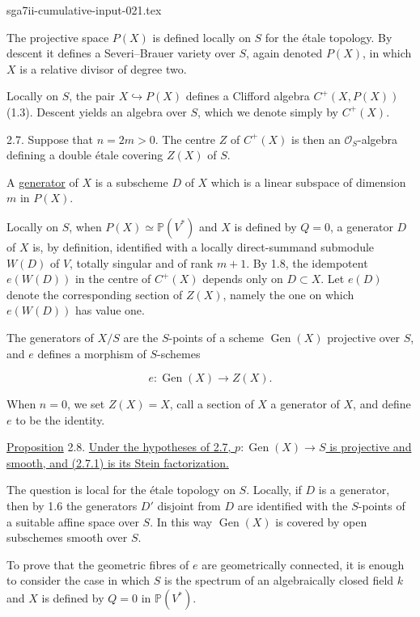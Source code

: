 \begin{filecontents*}{sga7ii-cumulative-input-021.tex}

The projective space $P(X)$ is defined locally on $S$ for the \'{e}tale
topology.  By descent it defines a Severi--Brauer variety over $S$,
again denoted $P(X)$, in which $X$ is a relative divisor of degree two.

Locally on $S$, the pair $X\hookrightarrow P(X)$ defines a Clifford
algebra $C^+(X,P(X))$ (1.3).  Descent yields an algebra over $S$, which
we denote simply by $C^+(X)$.

2.7. Suppose that $n=2m>0$.  The centre $Z$ of $C^+(X)$ is then an
$\mathcal O_S$-algebra defining a double \'{e}tale covering $Z(X)$ of
$S$.

A \underline{generator} of $X$ is a subscheme $D$ of $X$ which is a
linear subspace of dimension $m$ in $P(X)$.

Locally on $S$, when $P(X)\simeq\mathbb P(V^*)$ and $X$ is defined by
$Q=0$, a generator $D$ of $X$ is, by definition, identified with a
locally direct-summand submodule $W(D)$ of $V$, totally singular and of
rank $m+1$.  By 1.8, the idempotent $e(W(D))$ in the centre of $C^+(X)$
depends only on $D\subset X$.  Let $e(D)$ denote the corresponding
section of $Z(X)$, namely the one on which $e(W(D))$ has value one.

The generators of $X/S$ are the $S$-points of a scheme
$\operatorname{Gen}(X)$ projective over $S$, and $e$ defines a morphism
of $S$-schemes

\begin{equation}\tag{2.7.1}
e:\operatorname{Gen}(X)\longrightarrow Z(X).
\end{equation}

When $n=0$, we set $Z(X)=X$, call a section of $X$ a generator of $X$,
and define $e$ to be the identity.


\underline{Proposition} 2.8. \underline{Under the hypotheses of 2.7,
$p:\operatorname{Gen}(X)\longrightarrow S$ is projective and smooth,
and (2.7.1) is its Stein factorization.}

The question is local for the \'{e}tale topology on $S$.  Locally, if
$D$ is a generator, then by 1.6 the generators $D'$ disjoint from $D$
are identified with the $S$-points of a suitable affine space over $S$.
In this way $\operatorname{Gen}(X)$ is covered by open subschemes smooth
over $S$.

To prove that the geometric fibres of $e$ are geometrically connected,
it is enough to consider the case in which $S$ is the spectrum of an
algebraically closed field $k$ and $X$ is defined by $Q=0$ in
$\mathbb P(V^*)$.


\end{filecontents*}
